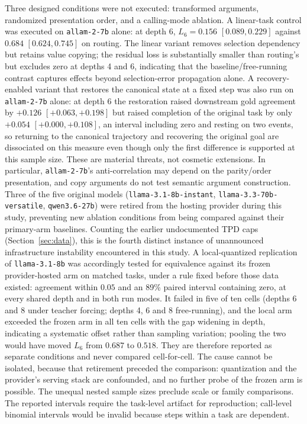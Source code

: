 \documentclass{article}
\begin{document}
Three designed conditions were not executed: transformed arguments, randomized presentation order, and a calling-mode ablation. A linear-task control was executed on \texttt{allam-2-7b} alone: at depth 6, $L_6=0.156$ $[0.089,0.229]$ against $0.684$ $[0.624,0.745]$ on routing. The linear variant removes selection dependency but retains value copying; the residual loss is substantially smaller than routing's but excludes zero at depths 4 and 6, indicating that the baseline/free-running contrast captures effects beyond selection-error propagation alone. A recovery-enabled variant that restores the canonical state at a fixed step was also run on \texttt{allam-2-7b} alone: at depth 6 the restoration raised downstream gold agreement by $+0.126$ $[+0.063,+0.198]$ but raised completion of the original task by only $+0.054$ $[+0.000,+0.108]$, an interval including zero and resting on two events, so returning to the canonical trajectory and recovering the original goal are dissociated on this measure even though only the first difference is supported at this sample size. These are material threats, not cosmetic extensions. In particular, \texttt{allam-2-7b}'s anti-correlation may depend on the parity/order presentation, and copy arguments do not test semantic argument construction. Three of the five original models (\texttt{llama-3.1-8b-instant}, \texttt{llama-3.3-70b-versatile}, \texttt{qwen3.6-27b}) were retired from the hosting provider during this study, preventing new ablation conditions from being compared against their primary-arm baselines. Counting the earlier undocumented TPD caps (Section~\ref{sec:data}), this is the fourth distinct instance of unannounced infrastructure instability encountered in this study. A local-quantized replication of \texttt{llama-3.1-8b} was accordingly tested for equivalence against its frozen provider-hosted arm on matched tasks, under a rule fixed before those data existed: agreement within $0.05$ and an 89\% paired interval containing zero, at every shared depth and in both run modes. It failed in five of ten cells (depths 6 and 8 under teacher forcing; depths 4, 6 and 8 free-running), and the local arm exceeded the frozen arm in all ten cells with the gap widening in depth, indicating a systematic offset rather than sampling variation; pooling the two would have moved $L_6$ from $0.687$ to $0.518$. They are therefore reported as separate conditions and never compared cell-for-cell. The cause cannot be isolated, because that retirement preceded the comparison: quantization and the provider's serving stack are confounded, and no further probe of the frozen arm is possible. The unequal nested sample sizes preclude scale or family comparisons. The reported intervals require the task-level artifact for reproduction; call-level binomial intervals would be invalid because steps within a task are dependent.
\end{document}
